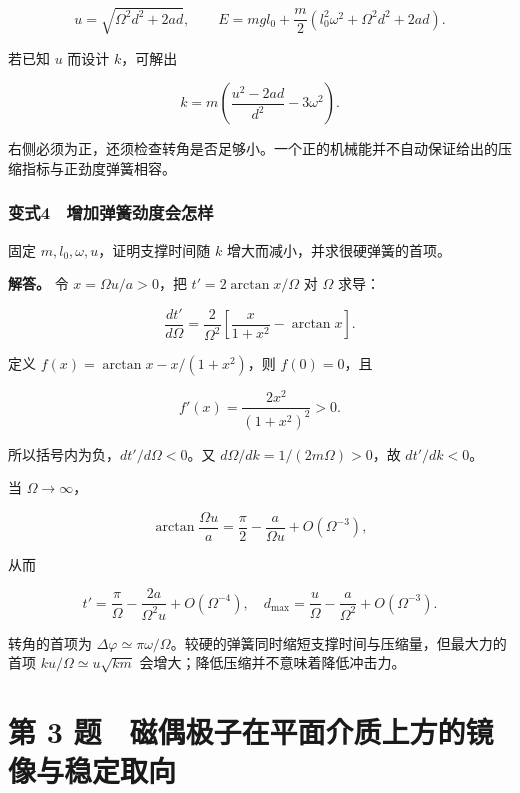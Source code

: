 \documentclass[12pt,a4paper,fontset=fandol]{ctexart}
\begin{document}
\[
u=\sqrt{\Omega^2d^2+2ad},\qquad
E=mgl_0+\frac m2
\left(l_0^2\omega^2+\Omega^2d^2+2ad\right).
\]

若已知 \(u\) 而设计 \(k\)，可解出

\[
k=m\left(\frac{u^2-2ad}{d^2}-3\omega^2\right).
\]

右侧必须为正，还须检查转角是否足够小。一个正的机械能并不自动保证给出的压缩指标与正劲度弹簧相容。

\begin{samepage}
\subsubsection{变式4　增加弹簧劲度会怎样}\label{ux53d8ux5f0f4-ux589eux52a0ux5f39ux7c27ux52b2ux5ea6ux4f1aux600eux6837}

固定 \(m,l_0,\omega,u\)，证明支撑时间随 \(k\)
增大而减小，并求很硬弹簧的首项。

\textbf{解答。} 令 \(x=\Omega u/a>0\)，把 \(t'=2\arctan x/\Omega\) 对
\(\Omega\) 求导：

\[
\frac{dt'}{d\Omega}
=\frac{2}{\Omega^2}
\left[\frac{x}{1+x^2}-\arctan x\right].
\]

定义 \(f(x)=\arctan x-x/(1+x^2)\)，则 \(f(0)=0\)，且

\[
f'(x)=\frac{2x^2}{(1+x^2)^2}>0.
\]

所以括号内为负，\(dt'/d\Omega<0\)。又 \(d\Omega/dk=1/(2m\Omega)>0\)，故
\(dt'/dk<0\)。

当 \(\Omega\to\infty\)，

\[
\arctan\frac{\Omega u}{a}
=\frac{\pi}{2}-\frac{a}{\Omega u}+O(\Omega^{-3}),
\]

从而

\[
t'=\frac{\pi}{\Omega}-\frac{2a}{\Omega^2u}+O(\Omega^{-4}),
\quad d_{\max}=\frac{u}{\Omega}-\frac a{\Omega^2}+O(\Omega^{-3}).
\]

转角的首项为
\(\Delta\varphi\simeq\pi\omega/\Omega\)。较硬的弹簧同时缩短支撑时间与压缩量，但最大力的首项
\(ku/\Omega\simeq u\sqrt{km}\) 会增大；降低压缩并不意味着降低冲击力。


\end{samepage}
\clearpage

\section{第 3
题　磁偶极子在平面介质上方的镜像与稳定取向}\label{ux7b2c-3-ux9898-ux78c1ux5076ux6781ux5b50ux5728ux5e73ux9762ux4ecbux8d28ux4e0aux65b9ux7684ux955cux50cfux4e0eux7a33ux5b9aux53d6ux5411}
\end{document}
